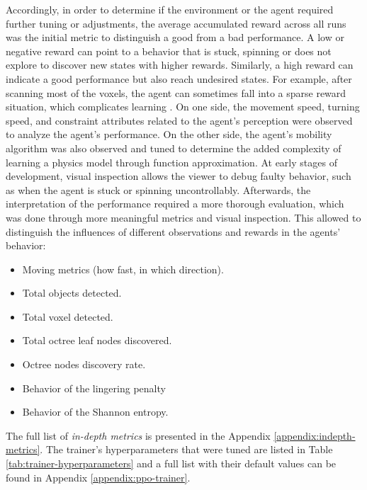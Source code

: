 Accordingly, in order to determine if the environment or the agent required further tuning or adjustments, the average accumulated reward across all runs was the initial metric to distinguish a good from a bad performance. A low or negative reward can point to a behavior that is stuck, spinning or does not explore to discover new states with higher rewards. Similarly, a high reward can indicate a good performance but also reach undesired states. For example, after scanning most of the voxels, the agent can sometimes fall into a sparse reward situation, which complicates learning \cite{sutton2018reinforcement}.
On one side, the movement speed, turning speed, and constraint attributes related to the agent's perception were observed to analyze the agent's performance. On the other side, the agent's mobility algorithm was also observed and tuned to determine the added complexity of learning a physics model through function approximation.
At early stages of development, visual inspection allows the viewer to debug faulty behavior, such as when the agent is stuck or spinning uncontrollably.
Afterwards, the interpretation of the performance required a more thorough evaluation, which was done through more meaningful metrics and visual inspection.
This allowed to distinguish the influences of different observations and rewards in the agents' behavior:
\begin{multicols}{2}
    \begin{itemize}
        \item Moving metrics (how fast, in which direction).
        \item Total objects detected.
        \item Total voxel detected.
        \item Total octree leaf nodes discovered.
        \item Octree nodes discovery rate.
        \item Behavior of the lingering penalty
        \item Behavior of the Shannon entropy.
    \end{itemize}
\end{multicols}
The full list of \textit{in-depth metrics} is presented in the Appendix \ref{appendix:indepth-metrics}.
The trainer's hyperparameters that were tuned are listed in Table \ref{tab:trainer-hyperparameters} and a full list with their default values can be found in Appendix \ref{appendix:ppo-trainer}. 


